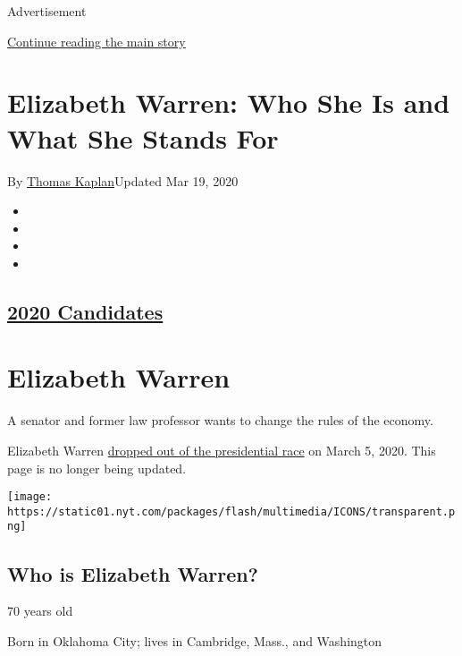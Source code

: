 Advertisement

\protect\hyperlink{after-top}{Continue reading the main story}

\hypertarget{elizabeth-warren-who-she-is-and-what-she-stands-for}{%
\section{Elizabeth Warren: Who She Is and What She Stands
For}\label{elizabeth-warren-who-she-is-and-what-she-stands-for}}

By \href{https://www.nytimes.com/by/thomas-kaplan}{Thomas Kaplan}Updated
Mar 19, 2020

\begin{itemize}
\item
\item
\item
\item
\end{itemize}

\hypertarget{2020-candidates}{%
\subsection{\texorpdfstring{\href{https://www.nytimes.com/interactive/2019/us/politics/2020-presidential-candidates.html}{2020
Candidates}}{2020 Candidates}}\label{2020-candidates}}

\hypertarget{elizabeth-warren}{%
\section{Elizabeth Warren}\label{elizabeth-warren}}

A senator and former law professor wants to change the rules of the
economy.

Elizabeth Warren
\href{https://www.nytimes.com/2020/03/05/us/politics/elizabeth-warren-drops-out.html}{dropped
out of the presidential race} on March 5, 2020. This page is no longer
being updated.

\texttt{[image: https://static01.nyt.com/packages/flash/multimedia/ICONS/transparent.png]}

\hypertarget{who-is-elizabeth-warren}{%
\subsection{Who is Elizabeth Warren?}\label{who-is-elizabeth-warren}}

70 years old

Born in Oklahoma City; lives in Cambridge, Mass., and Washington

